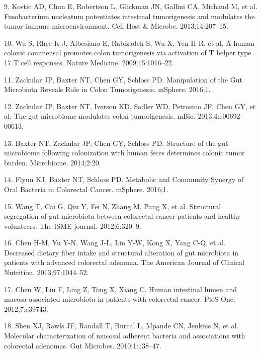 \documentclass[12pt,]{article}
\begin{document}
\hypertarget{ref-kostic_fusobacterium_2013}{}
9. Kostic AD, Chun E, Robertson L, Glickman JN, Gallini CA, Michaud M,
et al. Fusobacterium nucleatum potentiates intestinal tumorigenesis and
modulates the tumor-immune microenvironment. Cell Host \& Microbe.
2013;14:207--15.

\hypertarget{ref-wu_human_2009}{}
10. Wu S, Rhee K-J, Albesiano E, Rabizadeh S, Wu X, Yen H-R, et al. A
human colonic commensal promotes colon tumorigenesis via activation of T
helper type 17 T cell responses. Nature Medicine. 2009;15:1016--22.

\hypertarget{ref-zackular_manipulation_2016}{}
11. Zackular JP, Baxter NT, Chen GY, Schloss PD. Manipulation of the Gut
Microbiota Reveals Role in Colon Tumorigenesis. mSphere. 2016;1.

\hypertarget{ref-zackular_gut_2013}{}
12. Zackular JP, Baxter NT, Iverson KD, Sadler WD, Petrosino JF, Chen
GY, et al. The gut microbiome modulates colon tumorigenesis. mBio.
2013;4:e00692--00613.

\hypertarget{ref-baxter_structure_2014}{}
13. Baxter NT, Zackular JP, Chen GY, Schloss PD. Structure of the gut
microbiome following colonization with human feces determines colonic
tumor burden. Microbiome. 2014;2:20.

\hypertarget{ref-flynn_metabolic_2016}{}
14. Flynn KJ, Baxter NT, Schloss PD. Metabolic and Community Synergy of
Oral Bacteria in Colorectal Cancer. mSphere. 2016;1.

\hypertarget{ref-wang_structural_2012}{}
15. Wang T, Cai G, Qiu Y, Fei N, Zhang M, Pang X, et al. Structural
segregation of gut microbiota between colorectal cancer patients and
healthy volunteers. The ISME journal. 2012;6:320--9.

\hypertarget{ref-chen_decreased_2013}{}
16. Chen H-M, Yu Y-N, Wang J-L, Lin Y-W, Kong X, Yang C-Q, et al.
Decreased dietary fiber intake and structural alteration of gut
microbiota in patients with advanced colorectal adenoma. The American
Journal of Clinical Nutrition. 2013;97:1044--52.

\hypertarget{ref-chen_human_2012}{}
17. Chen W, Liu F, Ling Z, Tong X, Xiang C. Human intestinal lumen and
mucosa-associated microbiota in patients with colorectal cancer. PloS
One. 2012;7:e39743.

\hypertarget{ref-shen_molecular_2010}{}
18. Shen XJ, Rawls JF, Randall T, Burcal L, Mpande CN, Jenkins N, et al.
Molecular characterization of mucosal adherent bacteria and associations
with colorectal adenomas. Gut Microbes. 2010;1:138--47.
\end{document}
